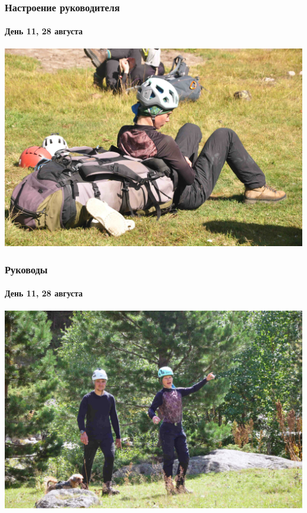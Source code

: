 \begin{frame}
\begin{columns}[c]
\begin{column}{0.45\textwidth}
		\end{column}
	\end{columns}
\end{frame}

\begin{frame}
	\frametitle{Настроение руководителя}
	\framesubtitle{День 11, 28 августа}	
	\centering
	\includegraphics[width=\textwidth]{../pics/DSC_0435 2}			
\end{frame}

\begin{frame}
	\frametitle{Руководы}
	\framesubtitle{День 11, 28 августа}	
	\centering
	\includegraphics[width=\textwidth]{../pics/DSC_0455 2}			
\end{frame}


